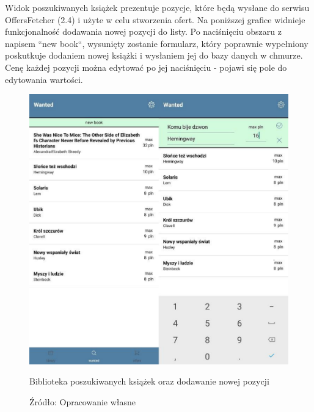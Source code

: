 Widok poszukiwanych książek prezentuje pozycje, które będą wysłane do serwisu OffersFetcher (2.4)  i użyte w celu stworzenia ofert.
Na poniższej grafice widnieje funkcjonalność dodawania nowej pozycji do listy. Po naciśnięciu  obszaru z napisem ``new book``, wysunięty zostanie formularz, który poprawnie wypełniony poskutkuje dodaniem nowej książki i wysłaniem jej do bazy danych w chmurze. Cenę każdej pozycji można edytować po jej naciśnięciu - pojawi się pole do edytowania wartości.
\begin{figure}[H]
	\centering
	\includegraphics[width=\linewidth]{wanted.pdf}
	\caption{\centering Biblioteka poszukiwanych książek oraz dodawanie nowej pozycji}
	\caption*{\centering Źródło: {Opracowanie własne}}
\end{figure}


